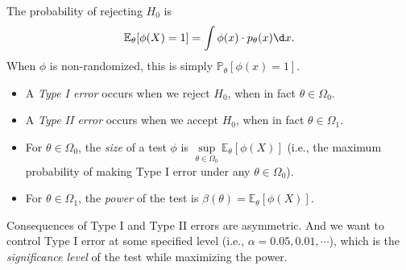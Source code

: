 \documentclass[a4paper]{article}
\begin{document}
\begin{note}
	The probability of rejecting $H_0$ is
	\begin{equation}
		\mathbb{E}_\theta[\phi(X) = 1] = \int \phi(x) \cdot p_\theta(x) \d x.
	\end{equation}
	When $\phi$ is non-randomized, this is simply $\mathbb{P}_\theta[\phi(x) = 1]$.
\end{note}

\begin{defi}
	\quad
	\begin{itemize}
		\item A \emph{Type I error} occurs when we reject $H_0$, when in fact $\theta \in \Omega_0$.
		\item A \emph{Type II error} occurs when we accept $H_0$, when in fact $\theta \in \Omega_1$.
		\item For $\theta \in \Omega_0$, the \emph{size} of a test $\phi$ is $\sup\limits_{\theta \in \Omega_0} \mathbb{E}_\theta[\phi(X)]$ (i.e., the maximum probability of making Type I error under any $\theta \in \Omega_0$).
		\item For $\theta \in \Omega_1$, the \emph{power} of the test is $\beta(\theta) = \mathbb{E}_\theta[\phi(X)]$.
	\end{itemize}
\end{defi}

\begin{remark}
	Consequences of Type I and Type II errors are asymmetric. And we want to control Type I error at some specified level (i.e., $\alpha = 0.05, 0.01, \cdots$), which is the \emph{significance level} of the test while maximizing the power.
\end{remark}
\end{document}
